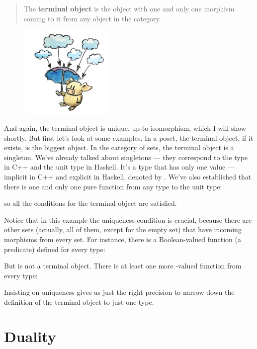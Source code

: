 \begin{quote}
The \textbf{terminal object} is the object with one and only one
morphism coming to it from any object in the category.
\end{quote}

\begin{figure}[H]
\centering
\includegraphics[width=0.4\textwidth]{images/final.jpg}
\end{figure}

\noindent
And again, the terminal object is unique, up to isomorphism, which I
will show shortly. But first let's look at some examples. In a poset,
the terminal object, if it exists, is the biggest object. In the
category of sets, the terminal object is a singleton. We've already
talked about singletons --- they correspond to the  type in
C++ and the unit type \code{()} in Haskell. It's a type that has only
one value --- implicit in C++ and explicit in Haskell, denoted by
\code{()}. We've also established that there is one and only one pure
function from any type to the unit type:

so all the conditions for the terminal object are satisfied.

Notice that in this example the uniqueness condition is crucial, because
there are other sets (actually, all of them, except for the empty set)
that have incoming morphisms from every set. For instance, there is a
Boolean-valued function (a predicate) defined for every type:

But  is not a terminal object. There is at least one more
-valued function from every type:

Insisting on uniqueness gives us just the right precision to narrow down
the definition of the terminal object to just one type.

\section{Duality}


